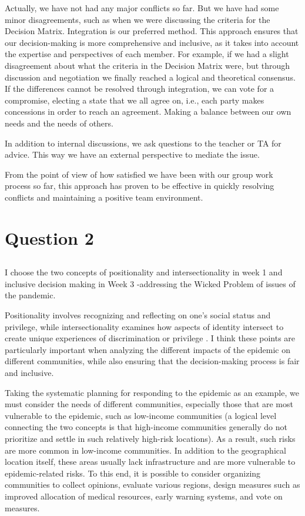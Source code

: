 \documentclass[UTF8,a4paper,AutoFakeBold,AutoFakeSlant]{article}
\begin{document}
Actually, we have not had any major conflicts so far. But we have had some minor disagreements, such as when we were discussing the criteria for the Decision Matrix. 
Integration is our preferred method. This approach ensures that our decision-making is more comprehensive and inclusive, as it takes into account the expertise and perspectives of each member. For example, if we had a slight disagreement about what the criteria in the Decision Matrix were, but through discussion and negotiation we finally reached a logical and theoretical consensus. If the differences cannot be resolved through integration, we can vote for a compromise, electing a state that we all agree on, i.e., each party makes concessions in order to reach an agreement. Making a balance between our own needs and the needs of others.

In addition to internal discussions, we ask questions to the teacher or TA for advice. This way we have an external perspective to mediate the issue.

From the point of view of how satisfied we have been with our group work process so far, this approach has proven to be effective in quickly resolving conflicts and maintaining a positive team environment.



\section{Question 2}

\subsection{}

I choose the two concepts of positionality and intersectionality in week 1 and inclusive decision making in Week 3 -addressing the Wicked Problem of issues of the pandemic.

Positionality involves recognizing and reflecting on one's social status and privilege, while intersectionality examines how aspects of identity intersect to create unique experiences of discrimination or privilege \cite{collins2015intersectionality}.
I think these points are particularly important when analyzing the different impacts of the epidemic on different communities, while also ensuring that the decision-making process is fair and inclusive.

Taking the systematic planning for responding to the epidemic as an example, we must consider the needs of different communities, especially those that are most vulnerable to the epidemic, such as low-income communities (a logical level connecting the two concepts is that high-income communities generally do not prioritize and settle in such relatively high-risk locations). As a result, such risks are more common in low-income communities. In addition to the geographical location itself, these areas usually lack infrastructure and are more vulnerable to epidemic-related risks. To this end, it is possible to consider organizing communities to collect opinions, evaluate various regions, design measures such as improved allocation of medical resources, early warning systems, and vote on measures.
\end{document}
